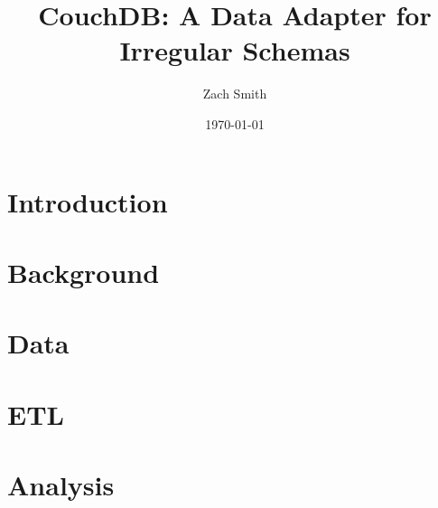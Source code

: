\documentclass[
    a4paper
]{report}
\title{CouchDB: A Data Adapter for Irregular Schemas}
\author{Zach Smith}
\date{\today}
\begin{document}
\maketitle
\thispagestyle{empty}

\begin{abstract}
    
\end{abstract}
\newpage

\tableofcontents
\newpage

\chapter{Introduction}


\chapter{Background}






\chapter{Data}
\label{chapter:data}


\chapter{ETL}




\chapter{Analysis}















\end{document}
